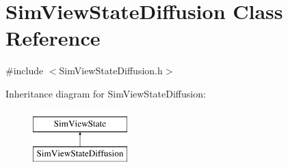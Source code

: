 \hypertarget{class_sim_view_state_diffusion}{\section{Sim\+View\+State\+Diffusion Class Reference}
\label{class_sim_view_state_diffusion}
}


{\ttfamily \#include $<$Sim\+View\+State\+Diffusion.\+h$>$}

Inheritance diagram for Sim\+View\+State\+Diffusion\+:\begin{figure}[H]
\begin{center}
\leavevmode
\includegraphics[height=2.000000cm]{class_sim_view_state_diffusion}
\end{center}
\end{figure}
